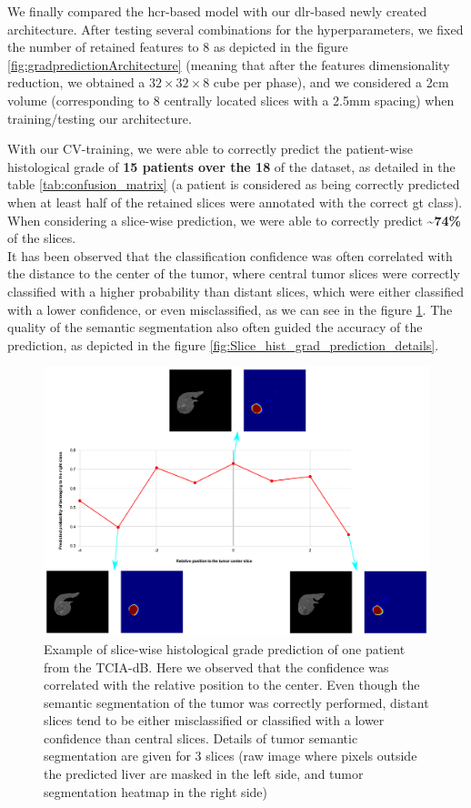 \documentclass[]{article}
\newcommand{\lmttfont}[1]{{\fontfamily{lmtt}\selectfont #1}}
\begin{document}
We finally compared the \ac{hcr}-based model with our \ac{dlr}-based newly created architecture.
After testing several combinations for the hyperparameters, we
fixed the number of retained features to 8 as depicted in the
figure \ref{fig:gradpredictionArchitecture} (meaning that after the features dimensionality reduction,
we obtained a $ 32\times32\times8 $ cube per phase), and we considered a 2cm volume
(corresponding to 8 centrally located slices with a 2.5mm spacing) when
training/testing our architecture.

With our CV-training, we were able to correctly predict the patient-wise
histological grade of \textbf{15 patients over the 18} of the dataset, as detailed in the table \ref{tab:confusion_matrix} (a patient is considered as being correctly predicted
when at least half of the retained slices were annotated with the
correct \ac{gt} class).
When considering a slice-wise prediction, we were able to correctly
predict \textbf{\textasciitilde{}74\%} of the slices.\\
It has been observed that the classification confidence was often correlated with the distance to the center of the tumor, where central tumor slices were correctly classified with a higher probability than distant slices, which were either classified with a lower confidence, or even misclassified, as we can see in the figure \ref{fig:Slice_hist_grad_prediction_2}. The quality of the semantic segmentation also often guided the accuracy of the prediction, as depicted in the figure \ref{fig:Slice_hist_grad_prediction_details}.

\begin{figure}[th!]
	\centering
	\includegraphics[width=0.7\linewidth]{../HistologicalGradePrediction/images/Slice_hist_grad_prediction_2}
	\caption{Example of slice-wise histological grade prediction of one patient from the \lmttfont{TCIA-dB}. Here we observed that the confidence was correlated with the relative position to the center. Even though the semantic segmentation of the tumor was correctly performed, distant slices tend to be either misclassified or classified with a lower confidence than central slices. Details of tumor semantic segmentation are given for 3 slices (raw image where pixels outside the predicted liver are masked in the left side, and tumor segmentation heatmap in the right side)}
	\label{fig:Slice_hist_grad_prediction_2}
\end{figure}
\end{document}
